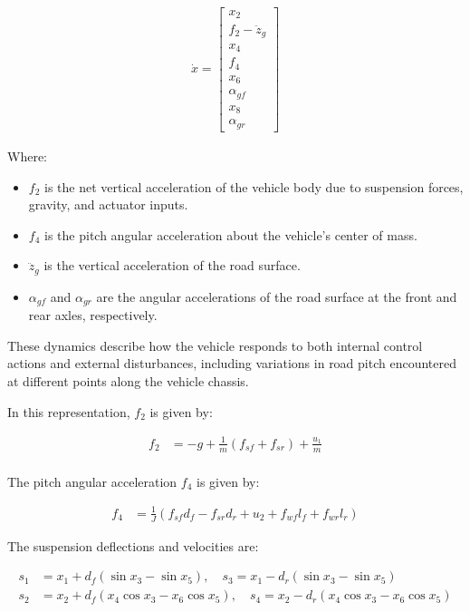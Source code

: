 \documentclass[]{report}
\begin{document}
\begin{align}
	\dot{x} = \begin{bmatrix}
		x_2 \\
		f_2 - \ddot{z}_g \\
		x_4 \\
		f_4 \\
		x_6 \\
		\alpha_{gf} \\
		x_8 \\
		\alpha_{gr}
	\end{bmatrix}
\end{align}

Where:
\begin{itemize}
	\item $f_2$ is the net vertical acceleration of the vehicle body due to suspension forces, gravity, and actuator inputs.
	\item $f_4$ is the pitch angular acceleration about the vehicle’s center of mass.
	\item $\ddot{z}_g$ is the vertical acceleration of the road surface.
	\item $\alpha_{gf}$ and $\alpha_{gr}$ are the angular accelerations of the road surface at the front and rear axles, respectively.
\end{itemize}

These dynamics describe how the vehicle responds to both internal control actions and external disturbances, including variations in road pitch encountered at different points along the vehicle chassis.

In this representation, $f_2$ is given by:

\begin{align}
	f_2 &= -g + \frac{1}{m}(f_{sf} + f_{sr}) + \frac{u_1}{m} \\
\end{align}

The pitch angular acceleration $f_4$ is given by:

\begin{align}	
	f_4 &= \frac{1}{J}(f_{sf} d_f - f_{sr} d_r + u_2 + f_{wf} l_{f} + f_{wr} l_{r})
\end{align}


The suspension deflections and velocities are:

\begin{align}
	s_1 &= x_1 + d_f(\sin x_3 - \sin x_5), \quad s_3 = x_1 - d_r(\sin x_3 - \sin x_5) \\
	s_2 &= x_2 + d_f(x_4 \cos x_3 - x_6 \cos x_5), \quad s_4 = x_2 - d_r(x_4 \cos x_3 - x_6 \cos x_5)
\end{align}
\end{document}
